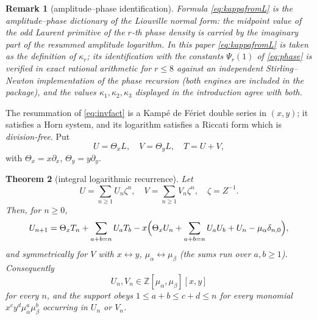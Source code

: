\documentclass[10pt,a4paper]{amsart}
\newtheorem{theorem}{Theorem}[section]
\newtheorem{remark}[theorem]{Remark}
\newcommand{\ma}{\mu_\alpha}
\newcommand{\mb}{\mu_\beta}
\begin{document}
\begin{remark}[amplitude--phase identification]\label{rem:identification}
Formula \eqref{eq:kappafromL} is the amplitude--phase dictionary of the Liouville normal form: the midpoint value of the odd Laurent primitive of the $r$-th phase density is carried by the imaginary part of the resummed amplitude logarithm.  In this paper \eqref{eq:kappafromL} is taken as the definition of $\kappa_r$; its identification with the constants $\Psi_r(1)$ of \eqref{eq:phase} is verified in exact rational arithmetic for $r\le8$ against an independent Stirling--Newton implementation of the phase recursion (both engines are included in the package), and the values $\kappa_1,\kappa_2,\kappa_3$ displayed in the introduction agree with both.
\end{remark}

The resummation of \eqref{eq:invfact} is a Kamp\'e de F\'eriet double series in $(x,y)$; it satisfies a Horn system, and its logarithm satisfies a Riccati form which is \emph{division-free}.  Put 
\[
U=\Theta_xL, \quad V=\Theta_yL, \quad T=U+V,
\]
with $\Theta_x=x\partial_x$, $\Theta_y=y\partial_y$.

\begin{theorem}[integral logarithmic recurrence]\label{thm:hornrec}
Let
\[
U=\sum_{n\ge1}U_n\zeta^n, \quad V=\sum_{n\ge1}V_n\zeta^n, \quad \zeta=Z^{-1}.
\]
Then, for $n\ge0$,
\begin{equation}\label{eq:hornrecc}
  U_{n+1}=\Theta_xT_n+\sum_{a+b=n}U_aT_b -x\Bigl(\Theta_xU_n+\sum_{a+b=n}U_aU_b+U_n-\ma\delta_{n,0}\Bigr),
\end{equation}
and symmetrically for $V$ with $x\leftrightarrow y$, $\ma\leftrightarrow\mb$
(the sums run over $a,b\ge1$).  Consequently
\[
U_n,V_n\in\mathbb Z[\ma,\mb][x,y]
\]
for every $n$, and the support obeys $1\le a+b\le c+d\le n$ for every monomial $x^cy^d\ma^a\mb^b$ occurring in $U_n$ or $V_n$.
\end{theorem}
\end{document}
